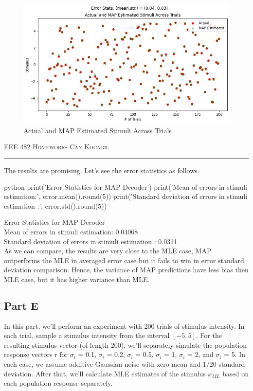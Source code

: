 \documentclass[12pt]{amsart}
\begin{document}
\begin{figure}[h]
    \centering
        \includegraphics[width = 1\textwidth]{images/Q2/MAP.png}
        \caption{Actual and MAP Estimated Stimuli Across Trials}
\end{figure}


\newpage
{\scshape EEE 482} \hfill {\scshape \large  Homework-\relax} \hfill {\scshape Can Kocagil}
\smallskip
\hrule
\vspace{2mm}

The results are promising. Let's see the error statistics as follows.


\begin{mintedbox}{python}
print('Error Statistics for MAP Decoder')
print('Mean of errors in stimuli estimation:', error.mean().round(5))
print('Standard deviation of errors in stimuli estimation :', error.std().round(5))
\end{mintedbox}

Error Statistics for MAP Decoder \\
Mean of errors in stimuli estimation: 0.04068  \\
Standard deviation of errors in stimuli estimation : 0.0311  \\

As we can compare, the results are very close to the MLE case, MAP outperforms the MLE in averaged error case but it fails to win in error standard deviation comparison. Hence, the variance of MAP predictions have less bias then MLE case, but it has higher variance than MLE.


\subsection{Part E}
In this part, we'll perform an experiment with 200 trials of stimulus intensity. In each trial, sample a stimulus intensity from the interval $[-5, 5]$. For the resulting stimulus vector (of length 200),
we'll separately simulate the population response vectors r for $\sigma_i$ = 0.1, $\sigma_i$ = 0.2, $\sigma_i$ = 0.5, $\sigma_i$ = 1, $\sigma_i$ = 2, and $\sigma_i$ = 5. In each case, we assume additive Gaussian noise with zero mean and $1/20$ standard deviation. After that, we'll calculate MLE estimates of the stimulus $x_{ML}$ based on each population response separately. 
\end{document}
